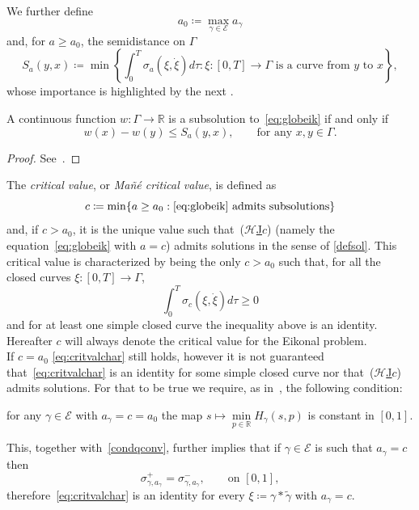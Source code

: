 \documentclass[11pt,a4paper,american]{article}
\newcommand{\Ecal}{\mathcal E}
\newcommand{\Hcal}{\mathcal H}
\newcommand{\Rds}{\mathds R}
\newcommand{\wtgamma}{\widetilde\gamma}
\newcommand{\hrefc}{\textup{(}\hyperref[eq:globeik]{\ensuremath{\Hcal}\textup{J}\ensuremath{c}}\textup{)}}
\begin{document}
    We further define
    \begin{equation*}
        a_0\coloneqq\max_{\gamma\in\Ecal}a_\gamma
    \end{equation*}
    and, for $a\ge a_0$, the semidistance on $\Gamma$
    \begin{equation*}
        S_a(y,x)\coloneqq\min\left\{\int_0^T\sigma_a\left(\xi,\dot\xi\right)d\tau:\text{$\xi:[0,T]\to\Gamma$ is a curve from $y$ to $x$}\right\},
    \end{equation*}
    whose importance is highlighted by the next .

    \begin{prop}\label{subsolchar}
        A continuous function $w:\Gamma\to\Rds$ is a subsolution to~\cref{eq:globeik} if and only if
        \begin{equation*}
            w(x)-w(y)\le S_a(y,x),\qquad\text{for any }x,y\in\Gamma.
        \end{equation*}
    \end{prop}
    \begin{proof}
        See~\cite{SiconolfiSorrentino18}.
    \end{proof}

    The \emph{critical value}, or \emph{Mañé critical value}, is defined as
    \begin{equation*}
        c\coloneqq\min\{a\ge a_0:\text{\cref{eq:globeik} admits subsolutions}\}
    \end{equation*}
    and, if $c>a_0$, it is the unique value such that~\hrefc{} (namely the equation~\cref{eq:globeik} with $a=c$) admits solutions in the sense of \cref{defsol}. This critical value is characterized by being the only $c>a_0$ such that, for all the closed curves $\xi:[0,T]\to\Gamma$,
    \begin{equation}\label{eq:critvalchar}
        \int_0^T\sigma_c\left(\xi,\dot\xi\right)d\tau\ge0
    \end{equation}
    and for at least one simple closed curve the inequality above is an identity. Hereafter $c$ will always denote the critical value for the Eikonal problem.\\
    If $c=a_0$ \cref{eq:critvalchar} still holds, however it is not guaranteed that~\cref{eq:critvalchar} is an identity for some simple closed curve nor that~\hrefc{} admits solutions. For that to be true we require, as in~\cite{SiconolfiSorrentino18}, the following condition:
    \begin{Hassum}[resume]
        \item for any $\gamma\in\Ecal$ with $a_\gamma=c=a_0$ the map $s\mapsto\min\limits_{p\in\Rds}H_\gamma(s,p)$ is constant in $[0,1]$.
    \end{Hassum}
    This, together with~\ref{condqconv}, further implies that if $\gamma\in\Ecal$ is such that $a_\gamma=c$ then
    \begin{equation}\label{eq:ceqa0sig}
        \sigma_{\gamma,a_\gamma}^+=\sigma_{\gamma,a_\gamma}^-,\qquad\text{on }[0,1],
    \end{equation}
    therefore~\cref{eq:critvalchar} is an identity for every $\xi\coloneqq\gamma*\wtgamma$ with $a_\gamma=c$.
\end{document}
